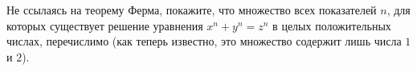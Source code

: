 Не ссылаясь на теорему Ферма, покажите, что множество всех показателей $n$, для которых существует
решение уравнения $x^n + y^n = z^n$ в целых положительных числах, перечислимо (как теперь известно, это
множество содержит лишь числа $1$ и $2$).
